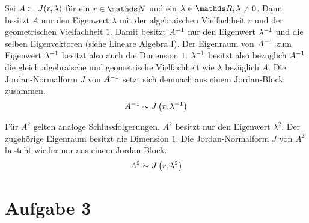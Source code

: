 		Sei $A\coloneqq J(r,\lambda)$ für ein $r\in\SN$ und ein $\lambda\in\SR,\lambda\neq 0$.
		Dann besitzt $A$ nur den Eigenwert $\lambda$ mit der algebraischen Vielfachheit $r$ und der geometrischen Vielfachheit $1$.
		Damit besitzt ${A}^{-1}$ nur den Eigenwert ${\lambda}^{-1}$ und die selben Eigenvektoren (siehe Lineare Algebra I).
		Der Eigenraum von ${A}^{-1}$ zum Eigenwert ${\lambda}^{-1}$ besitzt also auch die Dimension $1$.
		${\lambda}^{-1}$ besitzt also bezüglich ${A}^{-1}$ die gleich algebraische und geometrische Vielfachheit wie $\lambda$ bezüglich $A$.
		Die Jordan-Normalform $J$ von ${A}^{-1}$ setzt sich demnach aus einem Jordan-Block zusammen.
		\[ {A}^{-1} \sim J\left(  r, {\lambda}^{-1}  \right) \]

		Für $A^2$ gelten analoge Schlussfolgerungen.
		$A^2$ besitzt nur den Eigenwert $\lambda^2$.
		Der zugehörige Eigenraum besitzt die Dimension $1$.
		Die Jordan-Normalform $J$ von $A^2$ besteht wieder nur aus einem Jordan-Block.
		\[ A^2 \sim J\left(  r, \lambda^2  \right) \]


	\section*{Aufgabe 3} %
	\label{sec:aufgabe_3}
	

